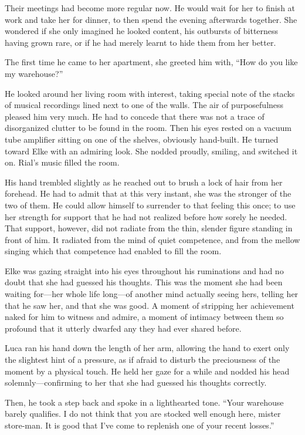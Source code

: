 \firstparagraph

Their meetings had become more regular now. He would wait for her to finish at work and take her for dinner, to then spend the evening afterwards together. She wondered if she only imagined he looked content, his outbursts of bitterness having grown rare, or if he had merely learnt to hide them from her better.

The first time he came to her apartment, she greeted him with, ``How do you like my warehouse?''

He looked around her living room with interest, taking special note of the stacks of musical recordings lined next to one of the walls. The air of purposefulness pleased him very much. He had to concede that there was not a trace of disorganized clutter to be found in the room. Then his eyes rested on a vacuum tube amplifier sitting on one of the shelves, obviously hand-built. He turned toward Elke with an admiring look. She nodded proudly, smiling, and switched it on. Rial's music filled the room.

His hand trembled slightly as he reached out to brush a lock of hair from her forehead. He had to admit that at this very instant, she was the stronger of the two of them. He could allow himself to surrender to that feeling this once; to use her strength for support that he had not realized before how sorely he needed. That support, however, did not radiate from the thin, slender figure standing in front of him. It radiated from the mind of quiet competence, and from the mellow singing which that competence had enabled to fill the room.

Elke was gazing straight into his eyes throughout his ruminations and had no doubt that she had guessed his thoughts. This was the moment she had been waiting for---her whole life long---of another mind actually seeing hers, telling her that he saw her, and that she was good. A moment of stripping her achievement naked for him to witness and admire, a moment of intimacy between them so profound that it utterly dwarfed any they had ever shared before.

Luca ran his hand down the length of her arm, allowing the hand to exert only the slightest hint of a pressure, as if afraid to disturb the preciousness of the moment by a physical touch. He held her gaze for a while and nodded his head solemnly---confirming to her that she had guessed his thoughts correctly.

Then, he took a step back and spoke in a lighthearted tone. ``Your warehouse barely qualifies. I do not think that you are stocked well enough here, mister store-man. It is good that I've come to replenish one of your recent losses.''

